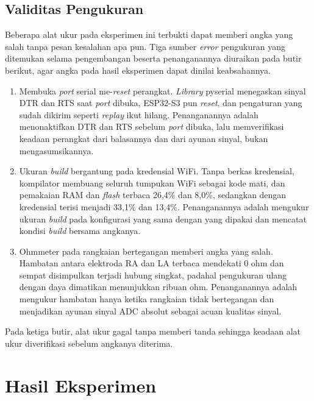 \subsection{Validitas Pengukuran}

Beberapa alat ukur pada eksperimen ini terbukti dapat memberi angka yang salah tanpa pesan kesalahan apa pun. Tiga sumber \textit{error} pengukuran yang ditemukan selama pengembangan beserta penanganannya diuraikan pada butir berikut, agar angka pada hasil eksperimen dapat dinilai keabsahannya.
\begin{enumerate}
  \item Membuka \textit{port} serial me-\textit{reset} perangkat. \textit{Library} pyserial menegaskan sinyal DTR dan RTS saat \textit{port} dibuka, ESP32-S3 pun \textit{reset}, dan pengaturan yang sudah dikirim seperti \textit{replay} ikut hilang. Penanganannya adalah menonaktifkan DTR dan RTS sebelum \textit{port} dibuka, lalu memverifikasi keadaan perangkat dari balasannya dan dari ayunan sinyal, bukan mengasumsikannya.
  \item Ukuran \textit{build} bergantung pada kredensial WiFi. Tanpa berkas kredensial, kompilator membuang seluruh tumpukan WiFi sebagai kode mati, dan pemakaian RAM dan \textit{flash} terbaca 26,4\% dan 8,0\%, sedangkan dengan kredensial terisi menjadi 33,1\% dan 13,4\%. Penanganannya adalah mengukur ukuran \textit{build} pada konfigurasi yang sama dengan yang dipakai dan mencatat kondisi \textit{build} bersama angkanya.
  \item Ohmmeter pada rangkaian bertegangan memberi angka yang salah. Hambatan antara elektroda RA dan LA terbaca mendekati 0 ohm dan sempat disimpulkan terjadi hubung singkat, padahal pengukuran ulang dengan daya dimatikan menunjukkan ribuan ohm. Penanganannya adalah mengukur hambatan hanya ketika rangkaian tidak bertegangan dan menjadikan ayunan sinyal ADC absolut sebagai acuan kualitas sinyal.
\end{enumerate}

Pada ketiga butir, alat ukur gagal tanpa memberi tanda sehingga keadaan alat ukur diverifikasi sebelum angkanya diterima.

\section{Hasil Eksperimen}

